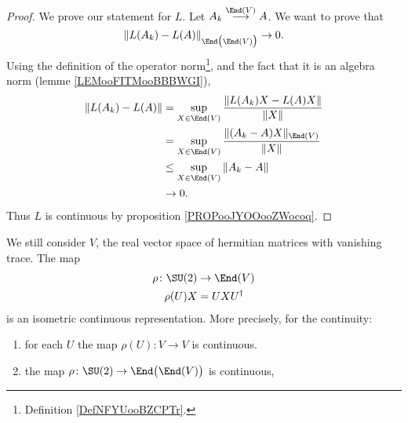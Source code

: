 \begin{proof}
    We prove our statement for \( L\). Let \( A_k\stackrel{\End(V)}{\longrightarrow}A\). We want to prove that
    \begin{equation}
        \| L(A_k)-L(A) \|_{\End\big( \End(V) \big)}\to 0.
    \end{equation}
    Using the definition of the operator norm\footnote{Definition \ref{DefNFYUooBZCPTr}.}, and the fact that it is an algebra norm (lemme \ref{LEMooFITMooBBBWGI}),
    \begin{subequations}
        \begin{align}
            \| L(A_k)-L(A) \|&=\sup_{X\in \End(V)}\frac{ \| L(A_k)X-L(A)X \| }{ \| X \| }\\
            &=\sup_{X\in \End(V)}\frac{ \| (A_k-A)X \|_{\End(V)} }{ \| X \| }\\
            &\leq \sup_{X\in\End(V)}\| A_k-A \|\\
            &\to 0.
        \end{align}
    \end{subequations}
    Thus \( L\) is continuous by proposition \ref{PROPooJYOOooZWocoq}.
\end{proof}

\begin{proposition}     \label{PROPooRQUZooAoZzwx}
    We still consider \( V\), the real vector space of hermitian matrices with vanishing trace. The map
    \begin{equation}
        \begin{aligned}
            \rho\colon \SU(2)&\to \End(V) \\
            \rho(U)X&=UXU^{\dag}
        \end{aligned}
    \end{equation}
    is an isometric continuous representation. More precisely, for the continuity:
    \begin{enumerate}
        \item       \label{ITEMooBZUQooNXNVfs}
            for each \( U\) the map \( \rho(U)\colon V\to V\) is continuous.
        \item       \label{ITEMooGHZYooQuabWb}
            the map \( \rho\colon \SU(2)\to \End\big( \End(V)\big) \) is continuous,
    \end{enumerate}
\end{proposition}

